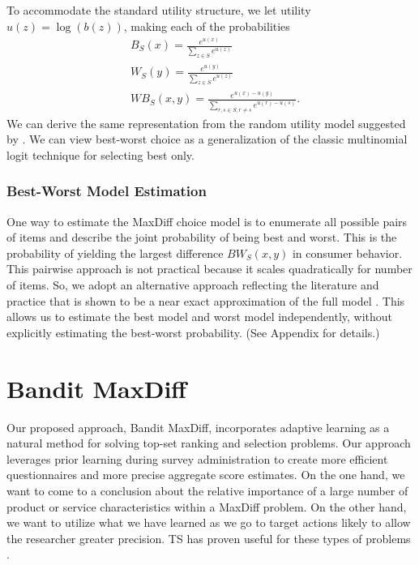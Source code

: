 \documentclass[nonblindrev]{informs3}
\begin{document}
To accommodate the standard utility structure, we let utility $u(z)=\log{(b(z))}$, making each of the probabilities 
\begin{align*}
&B_S(x)=\frac{e^{u(x)}}{\sum_{z \in S} e^{u(z)}}\\
&W_S(y)=\frac{e^{u(y)}}{\sum_{z \in S} e^{u(z)}}\\
&WB_S(x,y)=\frac{e^{u(x)-u(y)}}{\sum_{r,s \in S, r\neq s} e^{u(r)-u(s)}}.
\end{align*}
We can derive the same representation from the random utility model suggested by \cite{marley2005some}. We can view best-worst choice as a generalization of the classic multinomial logit technique for selecting best only.

\subsubsection{Best-Worst Model Estimation}

One way to estimate the MaxDiff choice model is to enumerate all possible pairs of items and describe the joint probability of being best and worst. This is the probability of yielding the largest difference $BW_S(x,y)$ in consumer behavior. This pairwise approach is not practical because it scales quadratically for number of items. So, we adopt an alternative approach reflecting the literature and practice that is shown to be a near exact approximation of the full model \cite{cohen2003maximum}. This allows us to estimate the best model and worst model independently, without explicitly estimating the best-worst probability. (See Appendix for details.)


\section{Bandit MaxDiff}


Our proposed approach, Bandit MaxDiff, incorporates adaptive learning as a natural method for solving top-set ranking and selection problems. Our approach leverages prior learning during survey administration to create more efficient questionnaires and more precise aggregate score estimates. On the one hand, we want to come to a conclusion about the relative importance of a large number of product or service characteristics within a MaxDiff problem. On the other hand, we want to utilize what we have learned as we go to target actions likely to allow the researcher greater precision. TS has proven useful for these types of problems \citep{schwartzetal2017,russo2017tutorial}.
\end{document}
